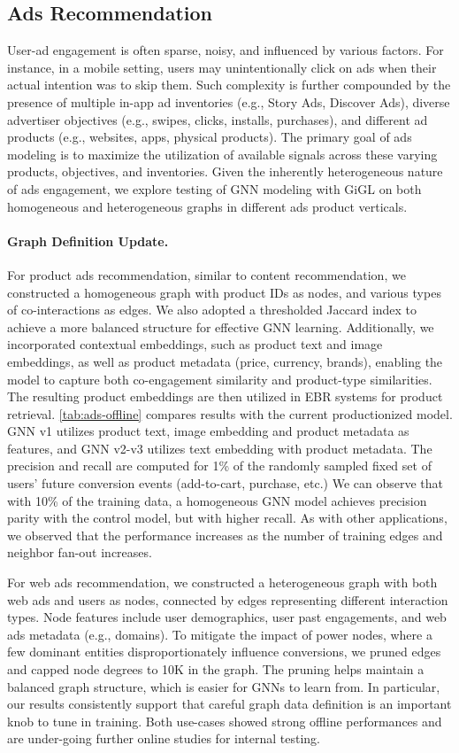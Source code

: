 
\subsection{Ads Recommendation}
User-ad engagement is often sparse, noisy, and influenced by various factors. For instance, in a mobile setting, users may unintentionally click on ads when their actual intention was to skip them. Such complexity is further compounded by the presence of multiple in-app ad inventories (e.g., Story Ads, Discover Ads), diverse advertiser objectives (e.g., swipes, clicks, installs, purchases), and different ad products (e.g., websites, apps, physical products). The primary goal of ads modeling is to maximize the utilization of available signals across these varying products, objectives, and inventories. Given the inherently heterogeneous nature of ads engagement, we explore testing of GNN modeling with GiGL on both homogeneous and heterogeneous graphs in different ads product verticals.

\paragraph{Graph Definition Update.}
For product ads recommendation, similar to content recommendation, we constructed a homogeneous graph with product IDs as nodes, and various types of co-interactions as edges. We also adopted a thresholded Jaccard index to achieve a more balanced structure for effective GNN learning.  Additionally, we incorporated contextual embeddings, such as product text and image embeddings, as well as product metadata (price, currency, brands), enabling the model to capture both co-engagement similarity and product-type similarities. The resulting product embeddings are then utilized in EBR systems for product retrieval.  \cref{tab:ads-offline} compares results with the current productionized model. GNN v1 utilizes product text, image embedding and product metadata as features, and GNN v2-v3 utilizes text embedding with product metadata. The precision and recall are computed for 1\% of the randomly sampled fixed set of users' future conversion events (add-to-cart, purchase, etc.) We can observe that with 10\% of the training data, a homogeneous GNN model achieves precision parity with the control model, but with higher recall. As with other applications, we observed that the performance increases as the number of training edges and neighbor fan-out increases. 

For web ads recommendation, we constructed a heterogeneous graph with both web ads and users as nodes, connected by edges representing different interaction types.
Node features include user demographics,  user past engagements, and web ads metadata (e.g., domains). To mitigate the impact of power nodes, where a few dominant entities disproportionately influence conversions, we pruned edges and capped node degrees to 10K in the graph. The pruning helps maintain a balanced graph structure, which is easier for GNNs to learn from.  In particular, our results consistently support that careful graph data definition is an important knob to tune in training. Both use-cases showed strong offline performances and are under-going further online studies for internal testing.

